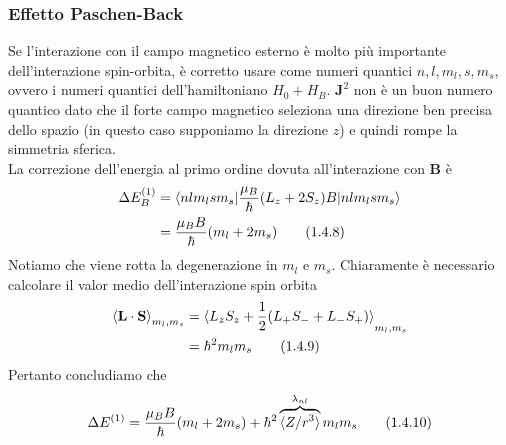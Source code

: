 \documentclass{article}
\begin{document}
\subsubsection*{Effetto Paschen-Back}
Se l'interazione con il campo magnetico esterno è molto più importante dell'interazione spin-orbita, è corretto usare come numeri quantici $n, l, m_l, s, m_s$, ovvero i numeri quantici dell'hamiltoniano $H_0 + H_B$. $\mathbf{J}^2$ non è un buon numero quantico dato che il forte campo magnetico seleziona una direzione ben precisa dello spazio (in questo caso supponiamo la direzione $z$) e quindi rompe la simmetria sferica. \\
La correzione dell'energia al primo ordine dovuta all'interazione con $\mathbf{B}$ è
\begin{align}
    \Delta E^{(1)}_B &= \braket{nlm_lsm_s|\frac{\mu_B}{\hbar}(L_z + 2S_z)B|nlm_lsm_s} \notag \\
    &= \frac{\mu_BB}{\hbar}(m_l + 2m_s) \tag{1.4.8}
\end{align}
Notiamo che viene rotta la degenerazione in $m_l$ e $m_s$. Chiaramente è necessario calcolare il valor medio dell'interazione spin orbita 
\begin{align}
    \braket{\mathbf{L} \cdot \mathbf{S}}_{m_l, m_s} &= \braket{L_zS_z + \frac{1}{2}(L_+S_- + L_-S_+)}_{m_l, m_s} \notag \\
    &= \hbar^2m_lm_s \tag{1.4.9}
\end{align}
Pertanto concludiamo che 
\begin{align}
    \Delta E^{(1)} = \frac{\mu_B B}{\hbar}(m_l + 2m_s) + \hbar^2\overbrace{\braket{Z/r^3}}^{\lambda_{nl}}m_lm_s \tag{1.4.10}
\end{align}
\end{document}
